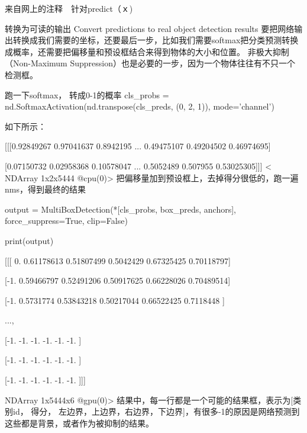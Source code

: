 \documentclass[11pt]{article}
\begin{document}
来自网上的注释　针对predict（ｘ)

转换为可读的输出 Convert predictions to real object detection results
要把网络输出转换成我们需要的坐标，还要最后一步，比如我们需要softmax把分类预测转换成概率，还需要把偏移量和预设框结合来得到物体的大小和位置。
非极大抑制（Non-Maximum
Suppression）也是必要的一步，因为一个物体往往有不只一个检测框。

跑一下softmax， 转成0-1的概率 cls\_probs =
nd.SoftmaxActivation(nd.transpose(cls\_preds, (0, 2, 1)),
mode='channel')

如下所示：

{[}{[}{[}0.92849267 0.97041637 0.8942195 ... 0.49475107 0.49204502
0.46974695{]}

{[}0.07150732 0.02958368 0.10578047 ... 0.5052489 0.507955
0.53025305{]}{]}{]} \textless{} NDArray 1x2x5444 @cpu(0)\textgreater{}
把偏移量加到预设框上，去掉得分很低的，跑一遍nms，得到最终的结果

output = MultiBoxDetection(*{[}cls\_probs, box\_preds, anchors{]},
force\_suppress=True, clip=False)

print(output)

{[}{[}{[} 0. 0.61178613 0.51807499 0.5042429 0.67325425 0.70118797{]}

{[}-1. 0.59466797 0.52491206 0.50917625 0.66228026 0.70489514{]}

{[}-1. 0.5731774 0.53843218 0.50217044 0.66522425 0.7118448 {]}

...,

{[}-1. -1. -1. -1. -1. -1. {]}

{[}-1. -1. -1. -1. -1. -1. {]}

{[}-1. -1. -1. -1. -1. -1. {]}{]}{]}

NDArray 1x5444x6 @gpu(0)\textgreater{}
结果中，每一行都是一个可能的结果框，表示为{[}类别id， 得分，
左边界，上边界，右边界，下边界{]}，有很多-1的原因是网络预测到这些都是背景，或者作为被抑制的结果。
\end{document}
